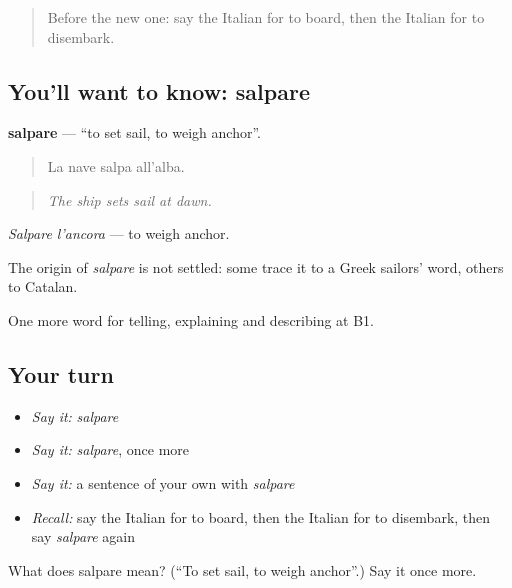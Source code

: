 \label{lesson:IT-C421-salpare}



\begin{quote}
Before the new one: say the Italian for to board, then the Italian for to disembark.
\end{quote}

\subsection*{You'll want to know: salpare}
\textbf{salpare} — \textquotedblleft{}to set sail, to weigh anchor\textquotedblright{}.

\begin{quote}
La nave salpa all'alba.
\end{quote}

\begin{quote}
\emph{The ship sets sail at dawn.}
\end{quote}

\emph{Salpare l'ancora} — to weigh anchor.

\begin{cousinweb}
The origin of \emph{salpare} is not settled: some trace it to a Greek sailors' word, others to Catalan.
\end{cousinweb}

\begin{grammarlens}[title={What you've built}]
One more word for telling, explaining and describing at B1.
\end{grammarlens}

\subsection*{Your turn}
\begin{itemize}
\raggedright
  \item \emph{Say it:} \emph{salpare}
  \item \emph{Say it:} \emph{salpare}, once more
  \item \emph{Say it:} a sentence of your own with \emph{salpare}
  \item \emph{Recall:} say the Italian for to board, then the Italian for to disembark, then say \emph{salpare} again
\end{itemize}

\begin{tcolorbox}[breakable,colback=teal!4,colframe=teal!35!black,title={Before you move on}]
What does salpare mean? (\textquotedblleft{}To set sail, to weigh anchor\textquotedblright{}.) Say it once more.
\end{tcolorbox}

